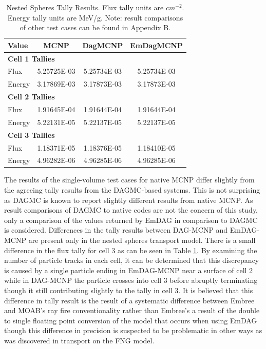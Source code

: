 \documentclass[12pt, a4paper]{article}
\begin{document}
\begin{table}[H]
  \small
  \begin{center}
    \begin{tabular}{lccc}
      \toprule
      Value & MCNP & DagMCNP & EmDagMCNP \\
      \toprule
      \multicolumn{4}{l}{\textbf{Cell 1 Tallies}} \\
      \hline
      Flux  & 5.25725E-03 & 5.25734E-03 & 5.25734E-03 \\
      Energy  & 3.17869E-03 &  3.17873E-03 &  3.17873E-03 \\
      \hline
      \multicolumn{4}{l}{\textbf{Cell 2 Tallies}} \\
      \hline
      Flux  & 1.91645E-04 & 1.91644E-04 & 1.91644E-04 \\
      Energy  & 5.22131E-05 & 5.22137E-05 & 5.22137E-05 \\
      \hline
      \multicolumn{4}{l}{\textbf{Cell 3 Tallies}} \\
      \hline
      Flux  & 1.18371E-05 & 1.18376E-05 & 1.18410E-05 \\
      Energy  & 4.96282E-06 & 4.96285E-06 & 4.96285E-06 \\
      \bottomrule
                        
    \end{tabular}
    \caption{Nested Spheres Tally Results. Flux tally units are $cm^{-2}$. Energy tally units are MeV/g. Note: result comparisons of other test cases can be found in Appendix B.}
    \label{nestedspheres}
  \end{center}
\end{table}


The results of the single-volume test cases for native MCNP differ slightly from the agreeing tally results from the DAGMC-based systems. This is not surprising as DAGMC is known to report slightly different results from native MCNP. As result comparisons of DAGMC to native codes are not the concern of this study, only a comparison of the values returned by EmDAG in comparison to DAGMC is considered. Differences in the tally results between DAG-MCNP and EmDAG-MCNP are present only in the nested spheres transport model. There is a small difference in the flux tally for cell 3 as can be seen in Table \ref{nestedspheres}. By examining the number of particle tracks in each cell, it can be determined that this discrepancy is caused by a single particle ending in EmDAG-MCNP near a surface of cell 2 while in DAG-MCNP the particle crosses into cell 3 before abruptly terminating though it still contributing slightly to the tally in cell 3. It is believed that this difference in tally result is the result of a systematic difference between Embree and MOAB's ray fire conventionality rather than Embree's a result of the double to single floating point conversion of the model that occurs when using EmDAG though this difference in precision is suspected to be problematic in other ways as was discovered in transport on the FNG model.
\end{document}
